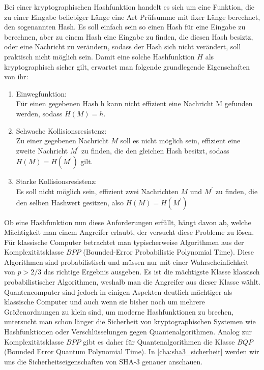 Bei einer kryptographischen Hashfunktion handelt es sich um eine Funktion, die zu einer Eingabe beliebiger Länge
eine Art Prüfsumme mit fixer Länge berechnet, den sogenannten Hash. 
Es soll einfach sein so einen Hash für eine Eingabe zu berechnen, aber zu einem Hash eine Eingabe zu finden,
die diesen Hash besiztz, oder eine Nachricht zu verändern, sodass der Hash sich nicht verändert, soll praktisch nicht möglich sein.
Damit eine solche Hashfunktion $H$ als kryptographisch sicher gilt, erwartet man folgende grundlegende Eigenschaften von ihr:
\begin{enumerate}
    \item Einwegfunktion:\\
    Für einen gegebenen Hash h kann nicht effizient eine Nachricht M gefunden werden, sodass $H(M) = h$.
	\item Schwache Kollisionsresistenz: \\
    Zu einer gegebenen Nachricht $M$ soll es nicht möglich sein, effizient eine zweite Nachricht $M^\prime$ zu finden,
    die den gleichen Hash besitzt, sodass $H(M) = H(M^\prime)$ gilt.
	\item Starke Kollisionsresistenz: \\
    Es soll nicht möglich sein, effizient zwei Nachrichten $M$ und $M^\prime$ zu finden, die den selben Hashwert gesitzen,
    also $H(M) = H(M^\prime)$ \cite{rogaway2004crypto}
\end{enumerate}
Ob eine Hashfunktion nun diese Anforderungen erfüllt, hängt davon ab, welche Mächtigkeit man einem Angreifer erlaubt,
der versucht diese Probleme zu lösen. Für klassische Computer betrachtet man typischerweise Algorithmen aus der Komplexitätsklasse $BPP$ (Bounded-Error Probabilistic Polynomial Time).
Diese Algorithmen sind probabilistisch und müssen nur mit einer Wahrscheinlichkeit von $p > 2/3$ das richtige Ergebnis ausgeben.
Es ist die mächtigste Klasse klassisch probabilistischer Algorithmen, weshalb man die Angreifer aus dieser Klasse wählt.
Quantencomputer sind jedoch in einigen Aspekten deutlich mächtiger als klassische Computer und auch wenn sie bisher
noch um mehrere Größenordnungen zu klein sind, um moderne Hashfunktionen zu brechen, untersucht man schon länger die Sicherheit
von kryptographischen Systemen wie Hashfunktionen oder Verschlüsselungen gegen Quantenalgorithmen. Analog zur Komplexitätsklasse $BPP$
gibt es daher für Quantenalgorithmen die Klasse $BQP$ (Bounded Error Quantum Polynomial Time). In \ref{cha:sha3_sicherheit} werden wir uns die
Sicherheitseigenschaften von SHA-3 genauer anschauen. \\

